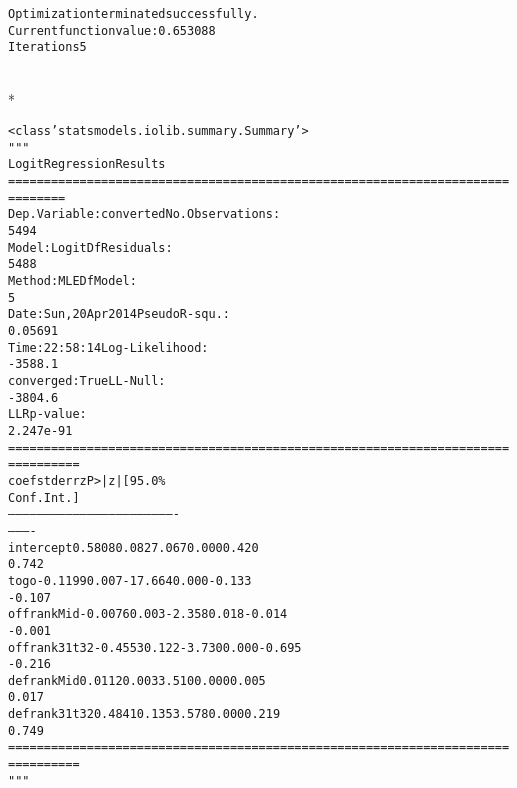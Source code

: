 \documentclass[letterpaper,10pt,english]{/anaconda/lib/python2.7/site-packages/sphinx/texinputs/sphinxhowto}
\def\smaller{\fontsize{9.5pt}{9.5pt}\selectfont}
\newenvironment{InvisibleVerbatim}
        {\begin{mdframed}[leftmargin=0.1\linewidth,innerleftmargin=3pt,innerrightmargin=3pt, userdefinedwidth=1\linewidth, linewidth=0pt, linecolor=white, usetwoside=false]}
        {\end{mdframed}}
\begin{document}
        

            
                \begin{InvisibleVerbatim}
                \vspace{-0.5\baselineskip}
\begin{alltt}Optimization terminated successfully.
         Current function value: 0.653088
         Iterations 5
\end{alltt}

            \end{InvisibleVerbatim}
            
                \makebox[0.1\linewidth]{\smaller\hfill\tt\color{nbframe-out-prompt}Out\hspace{4pt}{[}21{]}:\hspace{4pt}}\\*
                \vspace{-2.55\baselineskip}\begin{InvisibleVerbatim}
                \vspace{-0.5\baselineskip}
\begin{alltt}<class 'statsmodels.iolib.summary.Summary'>
"""
                           Logit Regression Results
======================================================================
========
Dep. Variable:              converted   No. Observations:
5494
Model:                          Logit   Df Residuals:
5488
Method:                           MLE   Df Model:
5
Date:                Sun, 20 Apr 2014   Pseudo R-squ.:
0.05691
Time:                        22:58:14   Log-Likelihood:
-3588.1
converged:                       True   LL-Null:
-3804.6
                                        LLR p-value:
2.247e-91
======================================================================
==========
                   coef    std err          z      P>|z|      [95.0\%
Conf. Int.]
----------------------------------------------------------------------
----------
intercept        0.5808      0.082      7.067      0.000         0.420
0.742
togo            -0.1199      0.007    -17.664      0.000        -0.133
-0.107
offrankMid      -0.0076      0.003     -2.358      0.018        -0.014
-0.001
offrank31t32    -0.4553      0.122     -3.730      0.000        -0.695
-0.216
defrankMid       0.0112      0.003      3.510      0.000         0.005
0.017
defrank31t32     0.4841      0.135      3.578      0.000         0.219
0.749
======================================================================
==========
"""\end{alltt}

            \end{InvisibleVerbatim}
            
\end{document}
